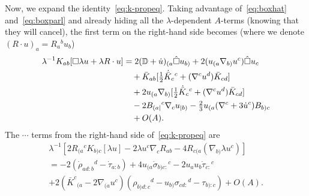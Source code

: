 \documentclass[a4paper]{article}
\theoremstyle{remark}
\newcommand{\la}{\lambda}
\newcommand{\D}{\mathbb{D}}
\begin{document}
Now, we expand the identity~\eqref{eq:k-propeq}. Taking advantage
of~\eqref{eq:boxhat} and~\eqref{eq:boxparl} and already hiding all the
$\la$-dependent $A$-terms (knowing that they will cancel), the first term on
the right-hand side becomes (where we denote $(R\cdot u)_a = R_a{}^b
u_b$)%
\begin{align}
	\notag
	\la^{-1} K_{ab}[\square \la u + \la R \cdot u] 
	&= 2(\D + \dot{u})_{(a} \hat{\square} u_{b)} + 2 (u_{(a} \nabla_{b)} u^c) \hat{\square} u_{c}
	\\ \notag & \quad {}
		+ \bar{K}_{ab} [\tfrac{1}{2} \dot{\bar{K}}_c{}^c + (\nabla^c u^d) \bar{K}_{cd}]
	\\ \notag & \quad {}
		+ 2 u_{(a} \nabla_{b)} [\tfrac{1}{2} \dot{\bar{K}}_c{}^c + (\nabla^c u^d) \bar{K}_{cd}]
	\\ \notag & \quad {}
		- 2 B_{(a|}{}^c \nabla_c u_{|b)} - \tfrac{2}{3} u_{(a} (\nabla^c + 3 \dot{u}^c) B_{b)c}
	\\ \label{eq:KB-propeq-Q} & \quad {}
		+ O(A)
	.
\end{align}
The $\cdots$ terms from the right-hand side of~\eqref{eq:k-propeq} are
\begin{multline} \label{eq:KB-propeq-ricci}
	\la^{-1} [2 R_{(a}{}^c K_{b)c}[\la u] - 2 \la u^c \nabla_c R_{ab} - 4 R_{c(a} (\nabla_{b)} \la u^c)]
	\\
	= -2 (\dot{\rho}_{ad:b}{}^d - \dot{\tau}_{a:b}) + 4 u_{(a}\dot{\sigma}_{b)c:}{}^c - 2 u_a u_b \dot{\tau}_{c:}{}^c
	\\
		+ 2(\bar{K}^c{}_{(a} - 2 \nabla_{(a}u^c) (\rho_{b)d:c}{}^d - u_{b)}\sigma_{cd:}{}^d - \tau_{b):c})
		+ O(A)
	.
\end{multline}
\end{document}
